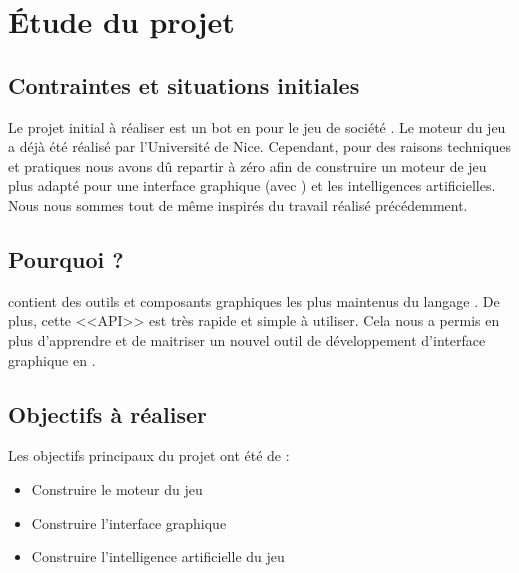 \section{Étude du projet}
\subsection{Contraintes et situations initiales}
Le projet initial à réaliser est un bot en \java pour le jeu de société \himalaya. Le moteur du jeu a déjà été réalisé par l'Université de Nice. Cependant, pour des raisons techniques et pratiques nous avons dû repartir à zéro afin de construire un moteur de jeu plus adapté pour une interface graphique (avec \fx) et les intelligences artificielles. Nous nous sommes tout de même inspirés du travail réalisé précédemment.

\subsection{Pourquoi \fx ?}
\fx contient des outils et composants graphiques les plus maintenus du langage \java.
De plus, cette <<API>> est très rapide et simple à utiliser.
Cela nous a permis en plus d’apprendre et de maitriser un nouvel outil de développement d’interface graphique en \java.

\subsection{Objectifs à réaliser}
Les objectifs principaux du projet ont été de :
\begin{itemize} 
	\item Construire le moteur du jeu 
	\item Construire l'interface graphique
	\item Construire l’intelligence artificielle du jeu
\end{itemize}
